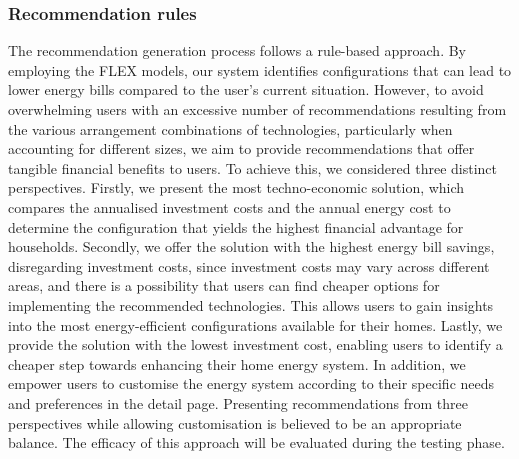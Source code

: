 \subsubsection{Recommendation rules}

The recommendation generation process follows a rule-based approach. 
By employing the FLEX models, our system identifies configurations that can lead to lower energy bills compared to the user's current situation.
However, to avoid overwhelming users with an excessive number of recommendations resulting from the various arrangement combinations of technologies, particularly when accounting for different sizes, 
we aim to provide recommendations that offer tangible financial benefits to users.
To achieve this, we considered three distinct perspectives.
Firstly, we present the most techno-economic solution, which compares the annualised investment costs and the annual energy cost to determine the configuration that yields the highest financial advantage for households. 
Secondly, we offer the solution with the highest energy bill savings, disregarding investment costs,
since investment costs may vary across different areas, and there is a possibility that users can find cheaper options for implementing the recommended technologies. 
This allows users to gain insights into the most energy-efficient configurations available for their homes. 
Lastly, we provide the solution with the lowest investment cost, enabling users to identify a cheaper step towards enhancing their home energy system.
In addition, we empower users to customise the energy system according to their specific needs and preferences in the detail page. 
Presenting recommendations from three perspectives while allowing customisation is believed to be an appropriate balance. 
The efficacy of this approach will be evaluated during the testing phase.


%

